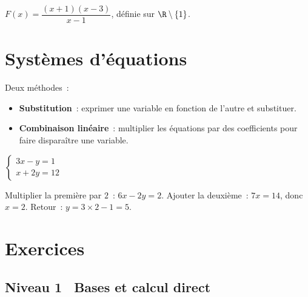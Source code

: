 \begin{ex}
$F(x) = \dfrac{(x+1)(x-3)}{x-1}$, d\'efinie sur $\R\setminus\{1\}$.
\begin{center}
\end{center}
\end{ex}

\section{Syst\`emes d'\'equations}

\begin{methode}
Deux m\'ethodes~:
\begin{itemize}
  \item \textbf{Substitution}~: exprimer une variable en fonction de l'autre
        et substituer.
  \item \textbf{Combinaison lin\'eaire}~: multiplier les \'equations par des
        coefficients pour faire dispara\^itre une variable.
\end{itemize}
\end{methode}

\begin{ex}
$\begin{cases}3x - y = 1 \\ x + 2y = 12\end{cases}$

Multiplier la premi\`ere par $2$~: $6x - 2y = 2$.
Ajouter la deuxi\`eme~: $7x = 14$, donc $x=2$.
Retour~: $y = 3\times2-1 = 5$.
\end{ex}

\section{Exercices}

\subsection*{\quad Niveau 1 \textemdash\ Bases et calcul direct}

